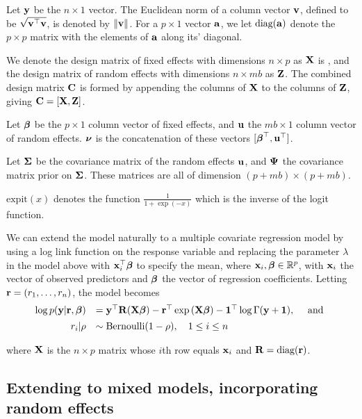 Let ${\bf y}$ be the $n \times 1$ vector. The Euclidean norm of a column vector
${\bf v}$, defined to be $\sqrt{{\bf v}^\top {\bf v}}$, is  denoted by $\|{\bf v}\|$. For a $p
\times 1$ vector ${\bf a}$, we let $\text{diag}{({\bf a})}$ denote the $p \times p$ matrix
with the elements of ${\bf a}$ along its' diagonal.

We denote the design matrix of fixed effects with dimensions $n \times p$ as
${\bf X}$ is , and the design matrix of random  effects with dimensions $n \times m
b$ as ${\bf Z}$. The combined design matrix ${\bf C}$ is formed by appending the
columns of ${\bf X}$ to the columns of ${\bf Z}$, giving ${\bf C} = [ {\bf X}, {\bf Z} ]$.

Let ${\boldsymbol \beta}$ be the $p \times 1$ column vector of fixed effects, and ${\bf u}$ the
$m b \times 1$ column vector of random effects. ${\boldsymbol \nu}$ is the concatenation of
these vectors $[{\boldsymbol \beta}^\top, {\bf u}^\top]$.

Let ${\boldsymbol \Sigma}$ be the covariance matrix of the random effects ${\bf u}$, and ${\boldsymbol \Psi}$
the covariance matrix prior on ${\boldsymbol \Sigma}$.  These matrices are all of dimension
$(p + m b) \times (p + m b)$.

$\text{expit}(x)$ denotes the function $\tfrac{1}{1 + \exp(-x)}$ which is the
inverse of the logit function.

We can extend the model naturally to a multiple covariate regression model by
using a log link function on the response variable and replacing the parameter
$\lambda$ in the model above with ${\bf x}_i^\top {\boldsymbol\beta}$ to specify the mean,
where ${\bf x}_i,{\boldsymbol \beta} \in {\mathbb{R}}^p$, with ${\bf x}_i$ the vector of observed predictors
and ${\boldsymbol \beta}$ the vector of regression coefficients. Letting ${\bf r} =
(r_1,\ldots,r_n)$, the model becomes
\begin{equation*}%
	\begin{array}{rl}
		\log p(\vy|\vr, \vbeta) 
		    & = \vy^\top \mR (\mX\vbeta)                           
		- \vr^\top \exp{(\mX\vbeta)} 
		- \vone^\top \log{\Gamma{(\vy + \vone)}}, \quad \mbox{ and }\\ [1ex]
		r_i | \rho & \sim \text{Bernoulli}(1-\rho), \quad 1 \leq i \leq n \\
	\end{array}
\end{equation*}

\noindent where ${\bf X}$ is the $n\times p$ matrix whose $i$th row equals ${\bf x}_i$
and ${\bf R} = \text{diag}{({\bf r})}$.

\subsection{Extending to mixed models, incorporating random effects}

